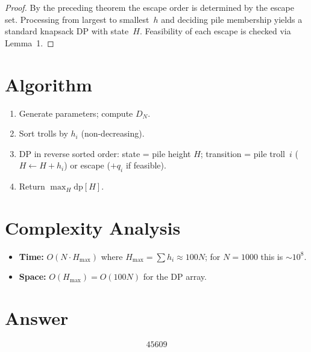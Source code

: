 \documentclass[11pt]{article}
\begin{document}
\begin{proof}
By the preceding theorem the escape order is determined by the escape set. Processing from largest to smallest~$h$ and deciding pile membership yields a standard knapsack DP with state~$H$. Feasibility of each escape is checked via Lemma~1.
\end{proof}

\section{Algorithm}

\begin{enumerate}
\item Generate parameters; compute $D_N$.
\item Sort trolls by $h_i$ (non-decreasing).
\item DP in reverse sorted order: state = pile height $H$; transition = pile troll~$i$ ($H \gets H + h_i$) or escape ($+q_i$ if feasible).
\item Return $\max_H \mathrm{dp}[H]$.
\end{enumerate}

\section{Complexity Analysis}
\begin{itemize}
\item \textbf{Time:} $O(N \cdot H_{\max})$ where $H_{\max} = \sum h_i \approx 100N$; for $N=1000$ this is $\sim 10^8$.
\item \textbf{Space:} $O(H_{\max}) = O(100N)$ for the DP array.
\end{itemize}

\section{Answer}

\[
\boxed{45609}
\]
\end{document}
